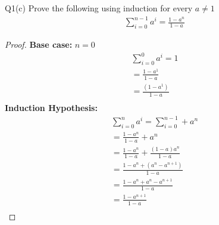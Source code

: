 \begin{problem}
  {Q1(c)}
  Prove the following using induction for every $a \ne 1$ \\
  \begin{align*}
    \sum_{i=0}^{n-1}a^i = \frac{1 - a^n}{1-a}
  \end{align*}
  \begin{proof}
    \textbf{Base case:} $n = 0$ \\
    \begin{align*}
      \sum_{i = 0}^{0} a^i = 1 \\
      = \frac{1 - a^1}{1 - a} \\
      = \frac{(1 - a^1)}{1 - a} \\
    \end{align*}
    \textbf{Induction Hypothesis:} \\
    \begin{align*}
      \sum_{i = 0}^{n} a^i = \sum_{i = 0}^{n-1} + a^n \\
      = \frac{1 - a^{n}}{1 - a} + a^n \\
      = \frac{1 - a^{n}}{1 - a} + \frac{(1 - a)a^n}{1 - a} \\
      = \frac{1 - a^{n} + (a^n - a^{n+1})}{1 - a} \\
      = \frac{1 - a^n + a^n - a^{n+1}}{1-a} \\
      = \frac{1 - a^{n+1}}{1-a} \\
    \end{align*}
  \end{proof}
\end{problem}
